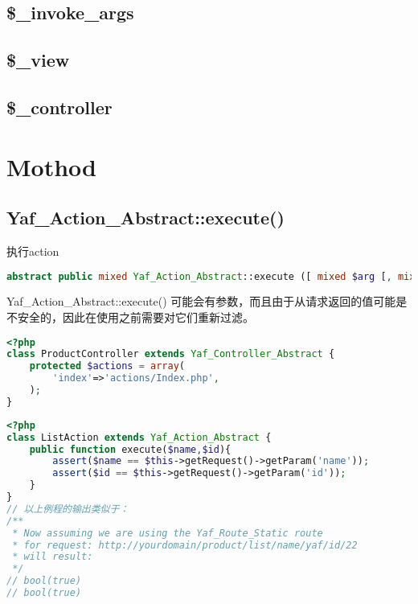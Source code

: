 \subsection{\$\_invoke\_args}


\subsection{\$\_view}



\subsection{\$\_controller}


\section{Mothod}


\subsection{Yaf\_Action\_Abstract::execute()}


执行action







\begin{lstlisting}[language=PHP]
abstract public mixed Yaf_Action_Abstract::execute ([ mixed $arg [, mixed $... ]] )
\end{lstlisting}

Yaf\_Action\_Abstract::execute() 可能会有参数，而且由于从请求返回的值可能是不安全的，因此在使用之前需要对它们重新过滤。



\begin{lstlisting}[language=PHP]
<?php
class ProductController extends Yaf_Controller_Abstract {
    protected $actions = array(
        'index'=>'actions/Index.php',
    );
}
\end{lstlisting}



\begin{lstlisting}[language=PHP]
<?php
class ListAction extends Yaf_Action_Abstract {
    public function execute($name,$id){
        assert($name == $this->getRequest()->getParam('name'));
        assert($id == $this->getRequest()->getParam('id'));
    }
}
// 以上例程的输出类似于：
/**
 * Now assuming we are using the Yaf_Route_Static route 
 * for request: http://yourdomain/product/list/name/yaf/id/22
 * will result:
 */
// bool(true)
// bool(true)
\end{lstlisting}





